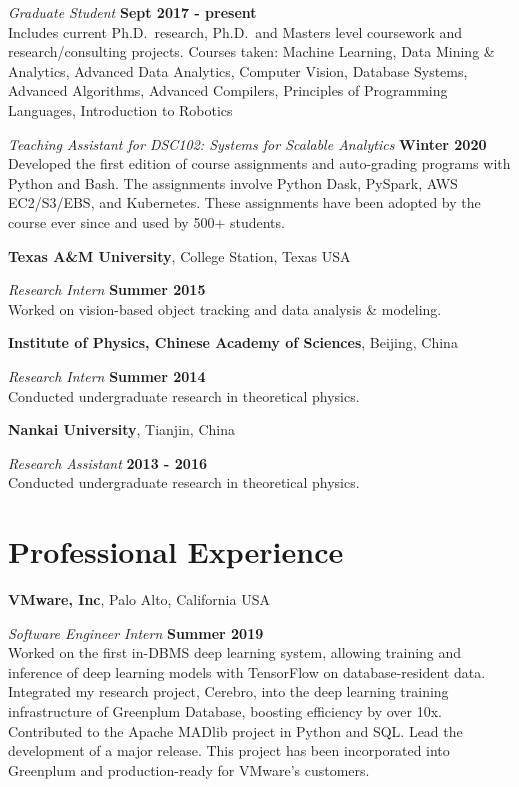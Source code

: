 \documentclass[margin,line]{res}
\begin{document}
\begin{resume}
\vspace{-.3cm}
{\em Graduate Student} \hfill {\bf Sept 2017 - present}\\
Includes current Ph.D.~research, Ph.D.~and Masters level coursework and
research/consulting projects.
Courses taken: Machine Learning, Data Mining \& Analytics, Advanced Data Analytics, Computer Vision, Database Systems, Advanced Algorithms, Advanced Compilers, Principles of Programming Languages, Introduction to Robotics

{\em Teaching Assistant for DSC102: Systems for Scalable Analytics} \hfill {\bf Winter 2020}\\
Developed the first edition of course assignments and auto-grading programs with Python and Bash. The assignments involve Python Dask, PySpark, AWS EC2/S3/EBS, and Kubernetes. These assignments have been adopted by the course ever since and used by 500+ students.

{\bf Texas A\&M University}, College Station, Texas USA

\vspace{-.3cm}
{\em Research Intern} \hfill {\bf Summer 2015}\\
Worked on vision-based object tracking and data analysis \& modeling.

{\bf Institute of Physics, Chinese Academy of Sciences}, Beijing, China

\vspace{-.3cm}
{\em Research Intern} \hfill {\bf Summer 2014}\\
Conducted undergraduate research in theoretical physics.

{\bf Nankai University}, Tianjin, China

\vspace{-.3cm}
{\em Research Assistant} \hfill {\bf 2013 - 2016}\\
Conducted undergraduate research in theoretical physics.

\section{\sc Professional Experience}
{\bf VMware, Inc}, Palo Alto, California USA

\vspace{-.3cm}
{\em Software Engineer Intern} \hfill {\bf Summer 2019}\\
Worked on the first in-DBMS deep learning system, allowing training and inference of deep learning models with TensorFlow on database-resident data. Integrated my research project, Cerebro, into the deep learning training infrastructure of Greenplum Database, boosting efficiency by over 10x. Contributed to the Apache MADlib project in Python and SQL. Lead the development of a major release. This project has been incorporated into Greenplum and production-ready for VMware's customers.


\end{resume}
\end{document}
